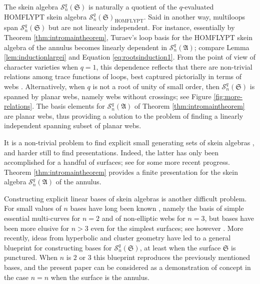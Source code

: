 \documentclass[12pt,
	]{amsart}
\theoremstyle{definition}
\newcommand{\mcal}[1]{\mathcal{#1}}
\newcommand{\mfrak}[1]{\mathfrak{#1}}
\newcommand{\sk}{\mcal{S}_n^q}
\newcommand{\ann}{\mfrak{A}}
\newcommand{\surf}{\mfrak{S}}
\begin{document}
The skein algebra $\sk(\surf)$ is naturally a quotient of the $q$-evaluated HOMFLYPT skein algebra $\mcal{S}_n^q(\surf)_\mathrm{HOMFLYPT}$.  Said in another way, multiloops span $\sk(\surf)$ but are not linearly independent.  For instance, essentially by Theorem \ref{thm:intromaintheorem}, Turaev's loop basis for the HOMFLYPT skein algebra of the annulus becomes linearly dependent in $\sk(\ann)$; compare Lemma \ref{lem:inductionlargei} and Equation \eqref{eq:rootsinduction1}.  From the point of view of character varieties when $q=1$, this dependence reflects that there are non-trivial relations among trace functions of loops, best captured pictorially in terms of webs \cite{SikoraTrans01}.  Alternatively, when $q$ is not a root of unity of small order, then $\sk(\surf)$ is spanned by planar webs, namely webs without crossings; see Figure \ref{fig:more-relations}.  The basis elements for $\sk(\ann)$ of Theorem \ref{thm:intromaintheorem} are planar webs, thus providing a solution to the problem of finding a linearly independent spanning subset of planar webs.  

It is a non-trivial problem to find explicit small generating sets of skein algebras \cite{baseilhac2023unrestrictedquantummodulialgebras, Frohman22MathZ}, and harder still to find presentations.  Indeed, the latter has only been accomplished for a handful of surfaces; see \cite{cooke2022higherrankaskeywilsonalgebras, mortonMR3626565} for some more recent progress.  Theorem \ref{thm:intromaintheorem} provides a finite presentation for the skein algebra $\sk(\ann)$ of the annulus.  

Constructing explicit linear bases of skein algebras is another difficult problem.  For small values of $n$ bases have long been known \cite{hosteMR1238877, KuperbergCommMathPhys96}, namely the basis of simple essential multi-curves for $n=2$ and of non-elliptic webs for $n=3$, but bases have been more elusive for $n>3$ even for the simplest surfaces; see however \cite{fontaineMR2889146, gaetz2024rotationinvariantwebbaseshourglass, queffelecMR3729501}.  More recently, ideas from hyperbolic and cluster geometry have led to a general blueprint for constructing bases for $\sk(\surf)$, at least when the surface $\surf$ is punctured.  When $n$ is $2$ or $3$ this blueprint reproduces the previously mentioned bases, and the present paper can be considered as a demonstration of concept in the case $n=n$ when the surface is the annulus.
\end{document}
